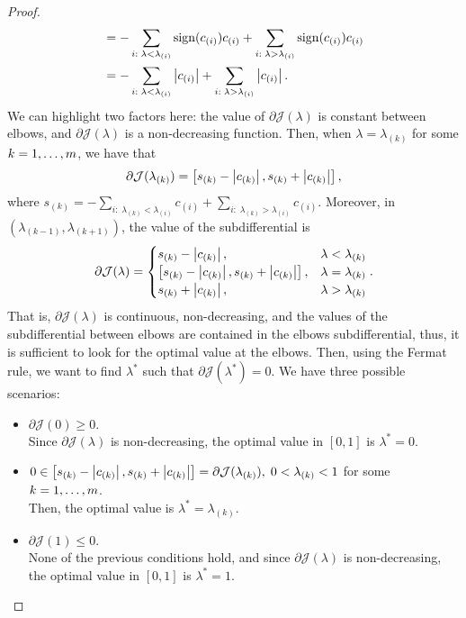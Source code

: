 \begin{proof}
\begin{equation}
\begin{aligned}
            &= - \sum_{i: \; \lambda < \lambda_{(i)}} \operatorname{sign}(c_{(i)}) {c_{(i)}} + \sum_{i: \; \lambda > \lambda_{(i)}} \operatorname{sign}(c_{(i)}) {c_{(i)}} \\
            &= - \sum_{i: \; \lambda < \lambda_{(i)}} \left|c_{(i)}\right| + \sum_{i: \; \lambda > \lambda_{(i)}} \left|c_{(i)}\right| .
        \end{aligned}        
    \end{equation}
    We can highlight two factors here: the value of $\partial \mathcal{J}(\lambda)$ is constant between elbows, and $\partial \mathcal{J}(\lambda)$ is a non-decreasing function.
    Then, when $\lambda = \lambda_{(k)}$ for some $k=1, \ldots, m$, we have that
    \begin{equation}
        \nonumber
        \partial \mathcal{J}(\lambda_{(k)}) = \left[ s_{(k)} - \left|c_{(k)}\right|, s_{(k)} + \left|c_{(k)}\right|   \right] ,
    \end{equation}
    where $s_{(k)} = - \sum_{i: \; \lambda_{(k)} < \lambda_{(i)}} c_{(i)} + \sum_{i: \; \lambda_{(k)} > \lambda_{(i)}} c_{(i)}.$
    Moreover, in $(\lambda_{(k-1)}, \lambda_{(k+1)})$, the value of the subdifferential is
    \begin{equation}
        \nonumber
        \partial \mathcal{J}(\lambda) = \begin{cases}
            s_{(k)} - \left|c_{(k)}\right|,& \lambda < \lambda_{(k)}\\
            \left[ s_{(k)} - \left|c_{(k)}\right|, s_{(k)} + \left|c_{(k)}\right|   \right],& \lambda = \lambda_{(k)} \\
            s_{(k)} + \left|c_{(k)}\right|,& \lambda > \lambda_{(k)}
        \end{cases} .
    \end{equation}
    That is, $\partial \mathcal{J}(\lambda)$ is continuous, non-decreasing, and the values of the subdifferential between elbows are contained in the elbows subdifferential, thus, it is sufficient to look for the optimal value at the elbows.
    Then, using the Fermat rule, we want to find $\lambda^*$ such that $\partial \mathcal{J}(\lambda^*) = 0$. We have three possible scenarios:
    \begin{itemize}
        \item $\partial \mathcal{J}(0) \geq 0.$ 
        \\Since $\partial \mathcal{J}(\lambda)$ is non-decreasing, the optimal value in $[0, 1]$ is $\lambda^* = 0$.
        \item $0 \in \left[ s_{(k)} - \left|c_{(k)}\right|, s_{(k)} + \left|c_{(k)}\right|   \right] = \partial \mathcal{J}(\lambda_{(k)}), \; 0 < \lambda_{(k)} < 1$ for some $k=1, \ldots, m$. 
        \\Then, the optimal value is $\lambda^*=\lambda_{(k)}$.
        \item $\partial \mathcal{J}(1) \leq 0$. 
        \\None of the previous conditions hold, and since $\partial \mathcal{J}(\lambda)$ is non-decreasing, the optimal value in $[0, 1]$ is $\lambda^* = 1$.
    \end{itemize}
\end{proof}
